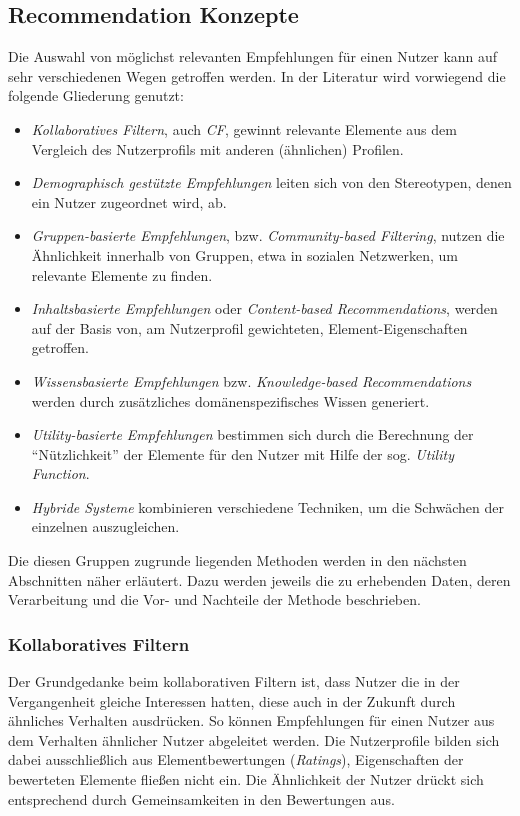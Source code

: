 \subsection{Recommendation Konzepte}\label{sec:concept}\label{sec:collaborativefiltering}
Die Auswahl von möglichst relevanten Empfehlungen für einen Nutzer kann auf sehr verschiedenen Wegen getroffen werden. In der Literatur wird vorwiegend die folgende Gliederung genutzt:  \citep[Kap. 1]{hb} \citep{Burke:2002:HRS:586321.586352} \citep{rs}

\begin{itemize}
\item \textit{Kollaboratives Filtern}, auch \textit{\acf{CF}}, gewinnt relevante Elemente aus dem Vergleich des Nutzerprofils mit anderen  (ähnlichen) Profilen.
\item \textit{Demographisch gestützte Empfehlungen} leiten sich von den Stereotypen, denen ein Nutzer zugeordnet wird, ab.
\item \textit{Gruppen-basierte Empfehlungen}, bzw. \textit{Community-based Filtering}, nutzen die Ähnlichkeit innerhalb von Gruppen, etwa in sozialen Netzwerken, um relevante Elemente zu finden.
\item \textit{Inhaltsbasierte Empfehlungen} oder \textit{Content-based Recommendations}, werden auf der Basis von, am Nutzerprofil gewichteten, Element-Eigenschaften getroffen.
\item \textit{Wissensbasierte Empfehlungen} bzw. \textit{Knowledge-based Recommendations} werden durch zusätzliches domänenspezifisches Wissen generiert.
\item \textit{Utility-basierte Empfehlungen} bestimmen sich durch die Berechnung der ``Nützlichkeit'' der Elemente für den Nutzer mit Hilfe der sog. \textit{Utility Function}.
\item \textit{Hybride Systeme} kombinieren verschiedene Techniken, um die Schwächen der einzelnen auszugleichen.
\end{itemize}

Die diesen Gruppen zugrunde liegenden Methoden werden in den nächsten Abschnitten näher erläutert. Dazu werden jeweils die zu erhebenden Daten, deren Verarbeitung und die Vor- und Nachteile der Methode beschrieben. %

\subsubsection{Kollaboratives Filtern}
\label{sec:cf_overview}
Der Grundgedanke beim kollaborativen Filtern ist, dass Nutzer die in der Vergangenheit gleiche Interessen hatten, diese auch in der Zukunft durch ähnliches Verhalten ausdrücken. So können Empfehlungen für einen Nutzer aus dem Verhalten ähnlicher Nutzer abgeleitet werden. Die Nutzerprofile bilden sich dabei ausschließlich aus Elementbewertungen (\textit{Ratings}), Eigenschaften der bewerteten Elemente fließen nicht ein.  Die Ähnlichkeit der Nutzer drückt sich entsprechend durch Gemeinsamkeiten in den Bewertungen aus. \citep[Kap. 2]{rs}

